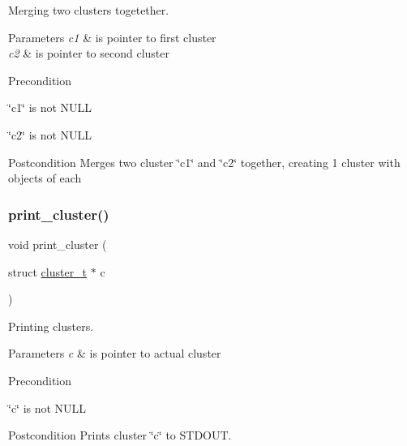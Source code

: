 Merging two clusters togetether. 


\begin{DoxyParams}{Parameters}
{\em c1} & is pointer to first cluster\\
\hline
{\em c2} & is pointer to second cluster\\
\hline
\end{DoxyParams}
\begin{DoxyPrecond}{Precondition}

\begin{DoxyItemize}
\item \char`\"{}c1\char`\"{} is not N\+U\+LL
\item \char`\"{}c2\char`\"{} is not N\+U\+LL
\end{DoxyItemize}
\end{DoxyPrecond}
\begin{DoxyPostcond}{Postcondition}
Merges two cluster \char`\"{}c1\char`\"{} and \char`\"{}c2\char`\"{} together, creating 1 cluster with objects of each 
\end{DoxyPostcond}
\mbox{\label{group___cluster_operations_ga322bfd43ab7a3fa830cd69e79b7eef06}} 
\subsubsection{\texorpdfstring{print\+\_\+cluster()}{print\_cluster()}}
{\footnotesize\ttfamily void print\+\_\+cluster (\begin{DoxyParamCaption}\item[{struct \mbox{\hyperlink{structcluster__t}{cluster\+\_\+t}} $\ast$}]{c }\end{DoxyParamCaption})}



Printing clusters. 


\begin{DoxyParams}{Parameters}
{\em c} & is pointer to actual cluster\\
\hline
\end{DoxyParams}
\begin{DoxyPrecond}{Precondition}

\begin{DoxyItemize}
\item \char`\"{}c\char`\"{} is not N\+U\+LL
\end{DoxyItemize}
\end{DoxyPrecond}
\begin{DoxyPostcond}{Postcondition}
Prints cluster \char`\"{}c\char`\"{} to S\+T\+D\+O\+UT. 
\end{DoxyPostcond}
\mbox{\label{group___cluster_operations_gad350e6021e5fead00ff2eeec4d134525}} 
